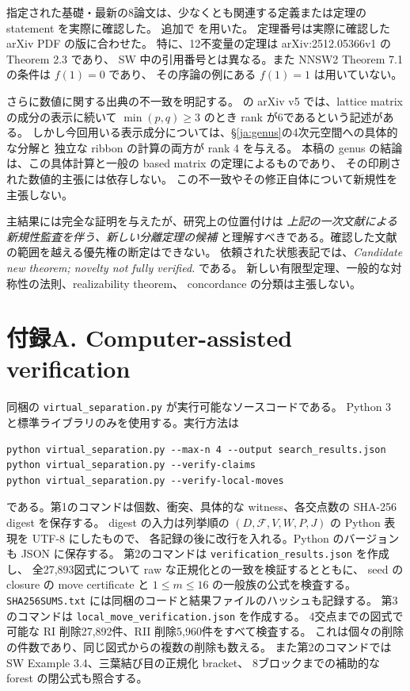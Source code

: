 \documentclass[12pt]{amsart}
\theoremstyle{definition}
\theoremstyle{remark}
\numberwithin{equation}{section}
\newcommand{\Package}{\mathcal F}
\begin{document}
指定された基礎・最新の8論文は、少なくとも関連する定義または定理の statement を実際に確認した。
追加で \cite{HNNS,Affine,KR,Turaev} を用いた。
定理番号は実際に確認した arXiv PDF の版に合わせた。
特に、12不変量の定理は arXiv:2512.05366v1 の Theorem 2.3 であり、
SW 中の引用番号とは異なる。また NNSW2 Theorem 7.1 の条件は $f(1)=0$ であり、
その序論の例にある $f(1)=1$ は用いていない。

さらに数値に関する出典の不一致を明記する。
\cite[\S4.3(1)]{Turaev} の arXiv v5 では、lattice matrix の成分の表示に続いて
$\min(p,q)\ge3$ のとき rank が6であるという記述がある。
しかし今回用いる表示成分については、\S\ref{ja:genus}の4次元空間への具体的な分解と
独立な ribbon の計算の両方が rank 4 を与える。
本稿の genus の結論は、この具体計算と一般の based matrix の定理によるものであり、
その印刷された数値的主張には依存しない。
この不一致やその修正自体について新規性を主張しない。

主結果には完全な証明を与えたが、研究上の位置付けは
\emph{上記の一次文献による新規性監査を伴う、新しい分離定理の候補}
と理解すべきである。確認した文献の範囲を越える優先権の断定はできない。
依頼された状態表記では、\emph{Candidate new theorem; novelty not fully verified.}
である。
新しい有限型定理、一般的な対称性の法則、realizability theorem、
concordance の分類は主張しない。

\section*{付録A. Computer-assisted verification}
\begingroup\small
同梱の \texttt{virtual\_separation.py} が実行可能なソースコードである。
Python 3 と標準ライブラリのみを使用する。実行方法は
\begin{lstlisting}
python virtual_separation.py --max-n 4 --output search_results.json
python virtual_separation.py --verify-claims
python virtual_separation.py --verify-local-moves
\end{lstlisting}
である。第1のコマンドは個数、衝突、具体的な witness、各交点数の SHA-256 digest を保存する。
digest の入力は列挙順の $(D,\Package,V,W,P,J)$ の Python 表現を UTF-8 にしたもので、
各記録の後に改行を入れる。Python のバージョンも JSON に保存する。
第2のコマンドは \texttt{verification\_results.json} を作成し、
全27,893図式について raw な正規化との一致を検証するとともに、
seed の closure の move certificate と $1\le m\le16$ の一般族の公式を検査する。
\texttt{SHA256SUMS.txt} には同梱のコードと結果ファイルのハッシュも記録する。
第3のコマンドは \texttt{local\_move\_verification.json} を作成する。
4交点までの図式で可能な RI 削除27,892件、RII 削除5,960件をすべて検査する。
これは個々の削除の件数であり、同じ図式からの複数の削除も数える。
また第2のコマンドでは SW Example 3.4、三葉結び目の正規化 bracket、
8ブロックまでの補助的な forest の閉公式も照合する。
\end{document}
